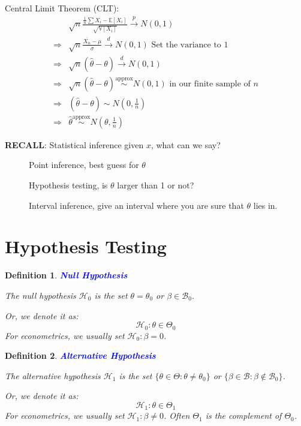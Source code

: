 \documentclass{article}
\newtheorem{definition}{Definition}
\begin{document}
Central Limit Theorem (CLT):
\begin{align*}
  & \sqrt{n} \frac{\frac{1}{n} \sum X_i - \mathbb{E}[X_i]}{\sqrt{\mathbb{V}[X_i]}} \overset{p}{\rightarrow} N(0, 1) \\
  \Rightarrow & \sqrt{n} \frac{\overline{X_n} - \mu}{\sigma} \overset{d}{\rightarrow} N(0, 1) \text{ Set the variance to 1} \\
  \Rightarrow & \sqrt{n} (\hat{\theta} - \theta) \overset{d}{\rightarrow} N(0, 1) \\
  \Rightarrow & \sqrt{n} (\hat{\theta} - \theta) \overset{\text{approx}}{\sim} N(0, 1) \text{ in our finite sample of } n \\
  \Rightarrow & (\hat{\theta} - \theta) \sim N\left(0, \frac{1}{n}\right) \\
  \Rightarrow & \hat{\theta} \overset{\text{approx}}{\sim} N\left(\theta, \frac{1}{n}\right) 
\end{align*}

\textbf{RECALL}: Statistical inference given $x$, what can we say?
\begin{description}
  \item[] Point inference, best guess for $\theta$
  \item[] Hypothesis testing, is $\theta$ larger than 1 or not?
  \item[] Interval inference, give an interval where you are sure that $\theta$ lies in.
\end{description}


\section{Hypothesis Testing}

\begin{definition}
  \textbf{\textcolor{blue}{Null Hypothesis}}
  
  The null hypothesis $\mathcal{H}_0$ is the set $\theta = \theta_0$ or $\beta
  \in \mathcal{B}_0$.
  
  Or, we denote it as:
  \[ \mathcal{H}_0 : \theta \in \Theta_0 \]
  For econometrics, we usually set $\mathcal{H}_0 : \beta = 0$.
\end{definition}

\begin{definition}
  \textbf{\textcolor{blue}{Alternative Hypothesis}}
  
  The alternative hypothesis $\mathcal{H}_1$ is the set $\{ \theta \in \Theta
  : \theta \neq \theta_0 \}$ or $\{ \beta \in \mathcal{B}  : \beta \notin
  \mathcal{B}_0 \}$.
  
  Or, we denote it as:
  \[ \mathcal{H}_1 : \theta \in \Theta_1 \]
  For econometrics, we usually set $\mathcal{H}_1 : \beta \neq 0$. Often
  $\Theta_1$ is the complement of $\Theta_0$.
\end{definition}
\end{document}
